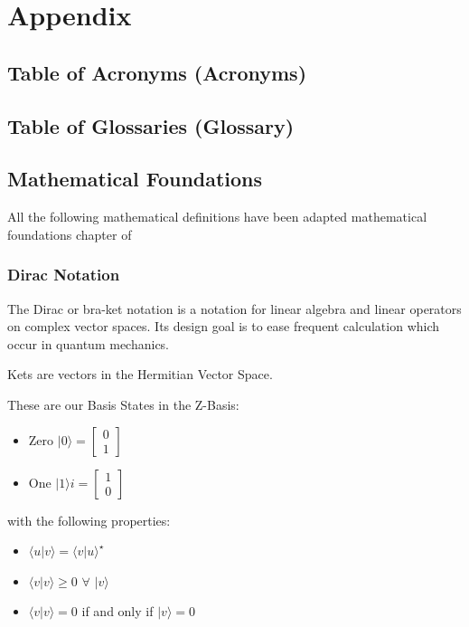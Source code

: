 \documentclass[11pt]{article}
\providecommand{\ket}[1]{|#1\rangle}
\providecommand{\braket}[2]{\langle#1|#2\rangle}
\newcommand{\myvec}[1]{\ensuremath{\begin{bmatrix}#1\end{bmatrix}}}
\renewcommand{\geq}{\geqslant}
\theoremstyle{definition}
\theoremstyle{definition}
\begin{document}
\section{Appendix}
\label{sec:org46d2c69}







\printglossaries
\listoffigures
\listoftables


\subsection{Table of Acronyms (Acronyms)}
\label{sec:orga59bb5b}

\subsection{Table of Glossaries (Glossary)}
\label{sec:org8bc0727}

\newpage


\subsection{Mathematical Foundations}
\label{sec:org9d349e2}
All the following mathematical definitions have been adapted mathematical foundations chapter of \cite{hayashi_introduction_2015}

\subsubsection{Dirac Notation}
\label{sec:orgafd391e}
The Dirac or bra-ket notation is a notation for linear algebra and linear operators on complex vector spaces.
Its design goal is to ease frequent calculation which occur in quantum mechanics.

Kets are vectors in the Hermitian Vector Space.

These are our Basis States in the Z-Basis:
\begin{itemize}
\item Zero \(\ket{0} = \myvec{0 \\ 1}\)
\item One \(\ket{1}i = \myvec{1 \\ 0}\)
\end{itemize}

with the following properties:
\begin{itemize}
\item \(\braket{u}{v}=\braket{v}{u}^\star\)
\item \(\braket{v}{v}\geq 0\) \(\forall\) \(\ket{v}\)
\item \(\braket{v}{v}= 0\) if and only if \(\ket{v}=0\)
\end{itemize}
\end{document}
